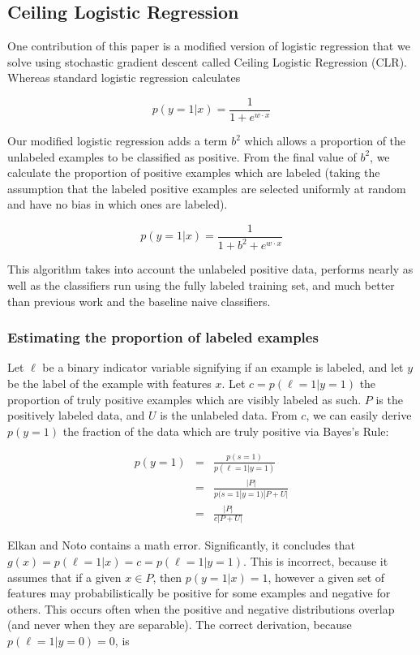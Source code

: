 \documentclass{article}
\begin{document}
\subsection{Ceiling Logistic Regression}

One contribution of this paper is a modified version of logistic regression that we solve using stochastic gradient descent called Ceiling Logistic Regression (CLR).  Whereas standard logistic regression calculates

$$ p(y=1|x) = \frac{1}{1 + e^{w \cdot x}} $$

Our modified logistic regression adds a term $b^2$ which allows a proportion of the unlabeled examples to be classified as positive. From the final value of $b^2$, we calculate the proportion of positive examples which are labeled (taking the assumption that the labeled positive examples are selected uniformly at random and have no bias in which ones are labeled).

$$ p(y=1|x) = \frac{1}{1 + b^2 + e^{w \cdot x}} $$

This algorithm takes into account the unlabeled positive data, performs nearly as well as the classifiers run using the fully labeled training set, and much better than previous work and the baseline naive classifiers.

\subsubsection{Estimating the proportion of labeled examples}

Let $\ell$ be a binary indicator variable signifying if an example is labeled, and let $y$ be the label of the example with features $x$. Let $c = p(\ell=1|y=1)$ the proportion of truly positive examples which are visibly labeled as such. $P$ is the positively labeled data, and $U$ is the unlabeled data. From $c$, we can easily derive $p(y=1)$ the fraction of the data which are truly positive via Bayes's Rule:

\begin{eqnarray*}
p(y=1) &=& \frac{p(s=1)}{p(\ell = 1|y = 1)} \\
 &=&  \frac{|P|}{p(s = 1|y = 1)|P+U|} \\
 &=& \frac{|P|}{c|P+U|}
\end{eqnarray*}

Elkan and Noto  contains a math error.  Significantly, it concludes that $g(x) = p(\ell=1|x) = c = p(\ell=1|y=1)$. This is incorrect, because it assumes that if a given $x \in P$, then $p(y=1|x) = 1$, however a given set of features may probabilistically be positive for some examples and negative for others. This occurs often when the positive and negative distributions overlap (and never when they are separable). The correct derivation, because $p(\ell=1|y=0)=0$, is
\end{document}
